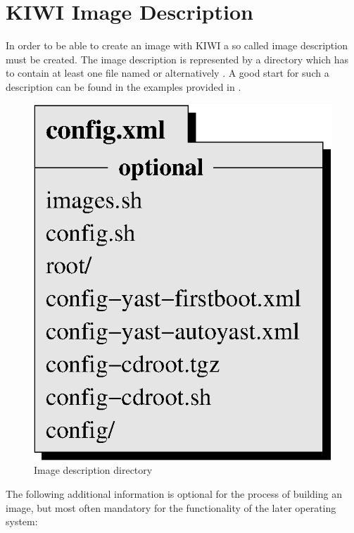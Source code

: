 \chapter{KIWI Image Description}
\label{chapter:description}
\minitoc

In order to be able to create an image with KIWI a so called
image description must be created. The image description is
represented by a directory which has to contain at least one
file named  or alternatively .
A good start for such a description can be found in the examples
provided in .

\begin{figure}[h]
\centering
\includegraphics[scale=0.5]{pictures/description.eps}
\caption{Image description directory}
\label{fig:description}
\end{figure}

The following additional information is optional for the process
of building an image, but most often mandatory for the functionality
of the later operating system:

